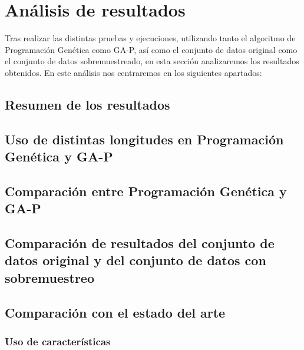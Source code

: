 \section{Análisis de resultados}

Tras realizar las distintas pruebas y ejecuciones, utilizando tanto el algoritmo de Programación Genética como GA-P, así como el conjunto de datos original como el conjunto de datos sobremuestreado, en esta sección analizaremos los resultados obtenidos. En este análisis nos centraremos en los siguientes apartados:


\subsection{Resumen de los resultados}



\subsection{Uso de distintas longitudes en Programación Genética y GA-P}

\newpage

\subsection{Comparación entre Programación Genética y GA-P}

\subsection{Comparación de resultados del conjunto de datos original y del conjunto de datos con sobremuestreo}

\subsection{Comparación con el estado del arte}




\subsubsection{Uso de características}



\newpage
